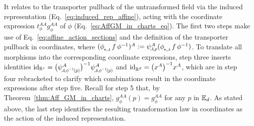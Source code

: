 It relates to the transporter pullback of the untransformed field via the induced representation (Eq.~\eqref{eq:induced_rep_affine}), acting with the coordinate expression $t_\phi^{AA} g_\phi^{AA}$ of $\phi$ (Eq.~\eqref{eq:AffGM_in_charts_eq}).
The first two steps make use of Eq.~\eqref{eq:affine_action_sections} and the definition of the transporter pullback in coordinates, where $(\dphiA f\, \phi^{-1})^A := \psiAp^A(\dphiA f\, \phi^{-1})$.
To translate all morphisms into the corresponding coordinate expressions, step three inserts identities $\id_{\R^c} = \big( \psiAphiinvp^A \big)^{-1} \psiAphiinvp^A$ and $\mathrm{id}_{\mathbb{R}^d} = \big( x^A \big)^{-1} x^A$, which are in step four rebracketed to clarify which combinations result in the coordinate expressions after step five.
Recall for step 5 that, by Theorem~\ref{thm:Aff_GM_in_charts}, $g_\phi^{AA}(p) = g_\phi^{AA}$ for any $p$ in $\mathbb{E}_d$.
As stated above, the last step identifies the resulting transformation law in coordinates as the action of the induced representation.


